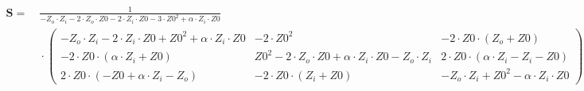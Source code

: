 $\begin{alignedat}{1}\mathbf{S}= & \:\frac{1}{-Z_o\cdot Z_i-2\cdot
Z_o\cdot Z0-2\cdot Z_i\cdot Z0-3\cdot Z0^2+\alpha\cdot Z_i\cdot Z0}\\
& \:\cdot \left(\begin{smallmatrix} -Z_o\cdot Z_i-2\cdot Z_i\cdot
Z0+Z0^2+\alpha\cdot Z_i\cdot Z0 & -2\cdot Z0^2 & -2\cdot Z0\cdot (Z_o
+Z0 ) \\ -2\cdot Z0 \cdot (\alpha\cdot Z_i +Z0 ) & Z0^2-2\cdot
Z_o\cdot Z0+\alpha\cdot Z_i\cdot Z0-Z_o\cdot Z_i & 2\cdot Z0\cdot
(\alpha\cdot Z_i-Z_i-Z0 ) \\ 2\cdot Z0\cdot (-Z0+\alpha\cdot Z_i-Z_o )
& -2\cdot Z0\cdot (Z_i+Z0 ) & -Z_o\cdot Z_i+Z0^2-\alpha\cdot Z_i\cdot
Z0 \end{smallmatrix}\right)\end{alignedat}$
